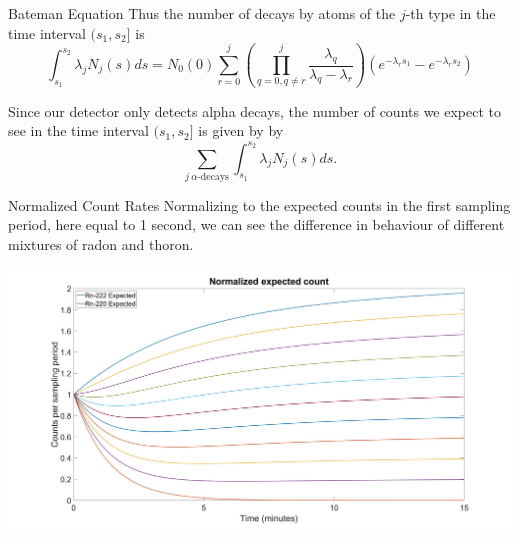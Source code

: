 \documentclass{beamer}
\newcommand{\nologo}{\setbeamertemplate{logo}{}}
\begin{document}
\begin{frame}{Bateman Equation}
    Thus the number of decays by atoms of the $j$-th type in the time interval $(s_1,s_2]$ is
$$
    \int_{s_1}^{s_2} \lambda_j N_j(s)ds = N_0(0)\sum_{r=0}^j\left(\prod_{q=0,q\neq r}^j \frac{\lambda_q}{\lambda_q-\lambda_r}\right)(e^{-\lambda_r s_1}-e^{-\lambda_r s_2})
$$  

Since our detector only detects alpha decays,
the number of counts we expect to see in the time interval $(s_1,s_2]$ is given by by
$$
    \sum_{j \: \alpha\text{-decays}}\int_{s_1}^{s_2}\lambda_j N_j(s)ds.
$$
\end{frame}
{\nologo
\begin{frame}{Normalized Count Rates}
Normalizing to the expected counts in the first sampling period, here equal to 1 second, we can see the difference in behaviour of different mixtures of radon and thoron.
    \begin{center}
        \includegraphics[width=\textwidth]{images/expected_counts.jpg}
    \end{center}
\end{frame}
}
\end{document}
